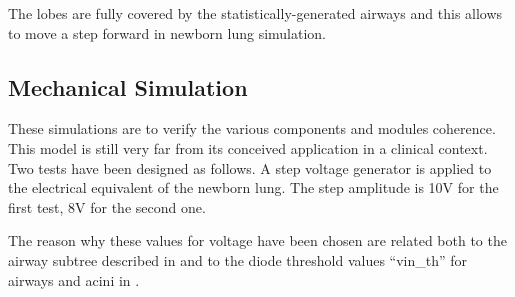 The lobes are fully covered by the statistically-generated airways and
this allows to move a step forward in newborn lung simulation.

\subsection{Mechanical Simulation}
\label{subsec:mechanical_results}



These simulations are to verify the various components and modules
coherence.  This model is still very far from its conceived
application in a clinical context.  Two tests have been designed as
follows.  A step voltage generator is applied to the electrical
equivalent of the newborn lung.  The step amplitude is 10V for the
first test, 8V for the second one.

The reason why these values for voltage have been chosen are related
both to the airway subtree described in 
and to the diode threshold values ``vin\_th'' for airways and acini in
.




